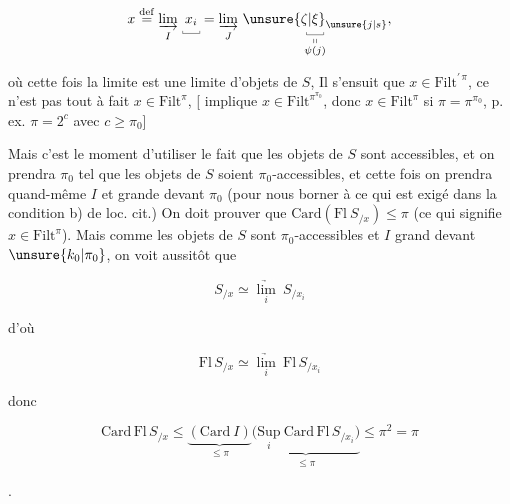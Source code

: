 \[
x\overset{\mathrm{def}}{=}\underset{I}{\underrightarrow{\lim}}\ \underset{\rule{.3pt}{2pt}\rule{1.2em}{.3pt}\rule{.3pt}{2pt}}{x_i}
=\underset{J}{\underrightarrow{\lim}}\ \underset{\substack{\rule{.3pt}{2pt}\rule{1.2em}{.3pt}\rule{.3pt}{2pt}\\\shortparallel\\\psi(j)}}{\unsure{\zeta|\xi}_{\unsure{j|s}}},
\]


où cette fois la limite est une limite d'objets de $S$,  Il s'ensuit que $x\in\mathrm{Filt}^{\prime\,\pi}$, ce n'est pas tout à fait $x\in\mathrm{Filt}^{\pi}$,  [ implique $x\in\mathrm{Filt}^{\pi^{\pi_0}}$,  donc $x\in\mathrm{Filt}^{\pi}$ si $\pi=\pi^{\pi_0}$, p. ex. $\pi=2^c$ avec $c\geq\pi_0$]

Mais c'est le moment d'utiliser le fait que les objets de $S$ sont accessibles, et on prendra $\pi_0$ tel que les objets de $S$ soient $\pi_0$-accessibles, et cette fois on prendra quand-même $I$  et grande devant $\pi_0$ (pour nous borner à ce qui est exigé dans la condition b) de loc. cit.) On doit prouver que $\mathrm{Card}(\mathrm{Fl}\ S_{/x})\leq\pi$ (ce qui signifie $x\in\mathrm{Filt}^{\pi}$). Mais comme les objets de $S$ sont $\pi_0$-accessibles et $I$ grand devant $\unsure{k_0|\pi_0}$, on voit aussitôt que

\[
S_{/x}\simeq\underset{i}{\underrightarrow{\lim}}\ S_{/x_i}
\]

d'où

\[
\mathrm{Fl}\,S_{/x}\simeq\underset{i}{\underrightarrow{\lim}}\ \mathrm{Fl}\,S_{/x_i}
\]

donc

\[
\mathrm{Card}\,\mathrm{Fl}\,S_{/x}\leq
\underbrace{(\mathrm{Card}\ I)}_{\leq\pi}
\underbrace{\bigl(\underset{i}{\mathrm{Sup}}\ \mathrm{Card}\,\mathrm{Fl}\,S_{/x_i}\bigr)}_{\leq\pi}
\leq\pi^2=\pi
\]

.

